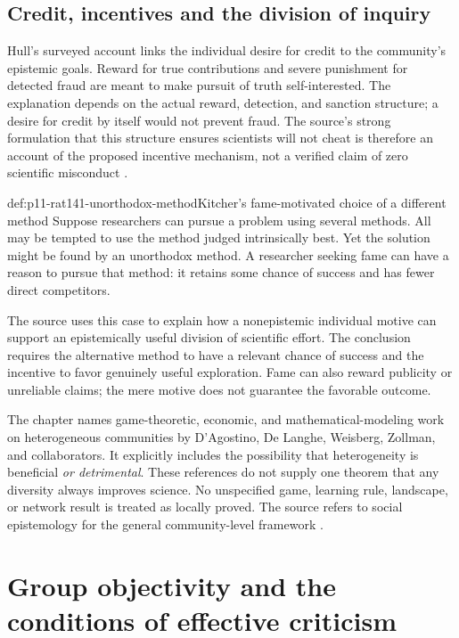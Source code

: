 \subsection{Credit, incentives and the division of inquiry}

Hull's surveyed account links the individual desire for credit to
the community's epistemic goals. Reward for true contributions and
severe punishment for detected fraud are meant to make pursuit of
truth self-interested. The explanation depends on the actual reward,
detection, and sanction structure; a desire for credit by itself would
not prevent fraud. The source's strong formulation that this structure
ensures scientists will not cheat is therefore an account of the
proposed incentive mechanism, not a verified claim of zero scientific
misconduct \parencite[p.~750]{AndersenAndersen2021Scientific}.

\begin{hbexample}{def:p11-rat141-unorthodox-method}{Kitcher's fame-motivated choice of a different method}
Suppose researchers can pursue a problem using several methods. All
may be tempted to use the method judged intrinsically best. Yet the
solution might be found by an unorthodox method. A researcher seeking
fame can have a reason to pursue that method: it retains some chance
of success and has fewer direct competitors.

The source uses this case to explain how a nonepistemic individual
motive can support an epistemically useful division of scientific
effort. The conclusion requires the alternative method to have a
relevant chance of success and the incentive to favor genuinely useful
exploration. Fame can also reward publicity or unreliable claims;
the mere motive does not guarantee the favorable outcome.
\end{hbexample}

The chapter names game-theoretic, economic, and mathematical-modeling
work on heterogeneous communities by D'Agostino, De Langhe,
Weisberg, Zollman, and collaborators. It explicitly includes the
possibility that heterogeneity is beneficial \emph{or detrimental}.
These references do not supply one theorem that any diversity always
improves science. No unspecified game, learning rule, landscape, or
network result is treated as locally proved. The source refers to
social epistemology for the general community-level framework
\parencite[pp.~750--751]{AndersenAndersen2021Scientific}.

\section{Group objectivity and the conditions of effective criticism}
\label{sec:p11-rat141-community-objectivity}

